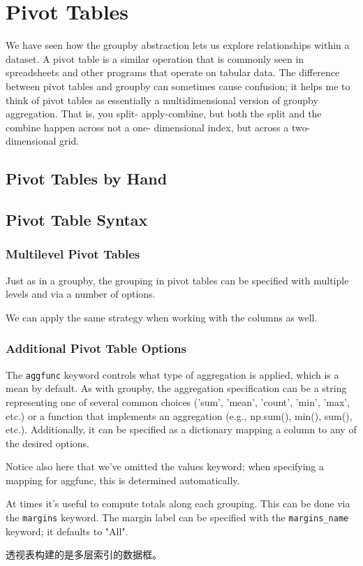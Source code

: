 \chapter{Pivot Tables\label{Ch21}}
We have seen how the groupby abstraction lets us explore relationships within a dataset. A pivot table is a similar operation that is commonly seen in spreadsheets and
other programs that operate on tabular data.  The difference between pivot tables
and groupby can sometimes cause confusion; it helps me to think of pivot tables as
essentially a multidimensional version of groupby aggregation. That is, you split-
apply-combine, but both the split and the combine happen across not a one-
dimensional index, but across a two-dimensional grid.

\section{Pivot Tables by Hand}
\section{Pivot Table Syntax}
\subsection*{Multilevel Pivot Tables}
Just as in a groupby, the grouping in pivot tables can be specified with multiple levels
and via a number of options.

We can apply the same strategy when working with the columns as well.

\subsection*{Additional Pivot Table Options}
The \verb|aggfunc| keyword controls what type of aggregation is applied, which is a mean
by default. As with groupby, the aggregation specification can be a string representing
one of several common choices ('sum', 'mean', 'count', 'min', 'max', etc.) or a
function that implements an aggregation (e.g., np.sum(), min(), sum(), etc.). Additionally, it can be specified as a dictionary mapping a column to any of the desired
options.

Notice also here that we've omitted the values keyword; when specifying a mapping
for aggfunc, this is determined automatically.

At times it's useful to compute totals along each grouping. This can be done via the
\verb|margins| keyword. The
margin label can be specified with the \verb|margins_name| keyword; it defaults to "All".

透视表构建的是多层索引的数据框。

